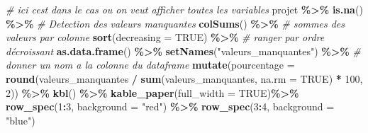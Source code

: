\documentclass[
]{article}
\newenvironment{Shaded}{\begin{snugshade}}{\end{snugshade}}
\newcommand{\AttributeTok}[1]{\textcolor[rgb]{0.13,0.29,0.53}{#1}}
\newcommand{\CommentTok}[1]{\textcolor[rgb]{0.56,0.35,0.01}{\textit{#1}}}
\newcommand{\ConstantTok}[1]{\textcolor[rgb]{0.56,0.35,0.01}{#1}}
\newcommand{\DecValTok}[1]{\textcolor[rgb]{0.00,0.00,0.81}{#1}}
\newcommand{\FunctionTok}[1]{\textcolor[rgb]{0.13,0.29,0.53}{\textbf{#1}}}
\newcommand{\NormalTok}[1]{#1}
\newcommand{\SpecialCharTok}[1]{\textcolor[rgb]{0.81,0.36,0.00}{\textbf{#1}}}
\newcommand{\StringTok}[1]{\textcolor[rgb]{0.31,0.60,0.02}{#1}}
\begin{document}
\begin{Shaded}
\begin{Highlighting}[]
 \CommentTok{\# ici c\textquotesingle{}est dans le cas ou on veut afficher toutes les variables}
\NormalTok{projet }\SpecialCharTok{\%\textgreater{}\%}
    \FunctionTok{is.na}\NormalTok{() }\SpecialCharTok{\%\textgreater{}\%}                \CommentTok{\# Detection des valeurs manquantes}
      \FunctionTok{colSums}\NormalTok{() }\SpecialCharTok{\%\textgreater{}\%}            \CommentTok{\# sommes des valeurs par colonne}
         \FunctionTok{sort}\NormalTok{(}\AttributeTok{decreasing =} \ConstantTok{TRUE}\NormalTok{) }\SpecialCharTok{\%\textgreater{}\%} \CommentTok{\# ranger par ordre décroissant}
            \FunctionTok{as.data.frame}\NormalTok{() }\SpecialCharTok{\%\textgreater{}\%}
              \FunctionTok{setNames}\NormalTok{(}\StringTok{"valeurs\_manquantes"}\NormalTok{) }\SpecialCharTok{\%\textgreater{}\%}  \CommentTok{\# donner un nom a la colonne du dataframe}
                \FunctionTok{mutate}\NormalTok{(}\AttributeTok{pourcentage =} \FunctionTok{round}\NormalTok{(valeurs\_manquantes }\SpecialCharTok{/} \FunctionTok{sum}\NormalTok{(valeurs\_manquantes, }\AttributeTok{na.rm =} \ConstantTok{TRUE}\NormalTok{) }\SpecialCharTok{*} \DecValTok{100}\NormalTok{, }\DecValTok{2}\NormalTok{)) }\SpecialCharTok{\%\textgreater{}\%}
                  \FunctionTok{kbl}\NormalTok{() }\SpecialCharTok{\%\textgreater{}\%} 
                    \FunctionTok{kable\_paper}\NormalTok{(}\AttributeTok{full\_width =} \ConstantTok{TRUE}\NormalTok{)}\SpecialCharTok{\%\textgreater{}\%}
                      \FunctionTok{row\_spec}\NormalTok{(}\DecValTok{1}\SpecialCharTok{:}\DecValTok{3}\NormalTok{, }\AttributeTok{background =} \StringTok{"red"}\NormalTok{) }\SpecialCharTok{\%\textgreater{}\%} 
                        \FunctionTok{row\_spec}\NormalTok{(}\DecValTok{3}\SpecialCharTok{:}\DecValTok{4}\NormalTok{, }\AttributeTok{background =} \StringTok{"blue"}\NormalTok{)}
\end{Highlighting}
\end{Shaded}
\end{document}

